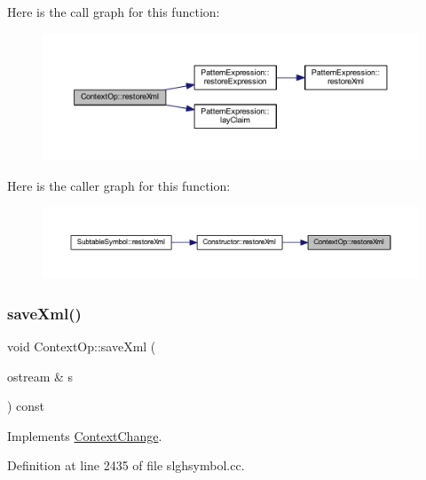 Here is the call graph for this function\+:
\nopagebreak
\begin{figure}[H]
\begin{center}
\leavevmode
\includegraphics[width=350pt]{class_context_op_ad116f3dd9045a92b84ae10eefaf74f04_cgraph}
\end{center}
\end{figure}
Here is the caller graph for this function\+:
\nopagebreak
\begin{figure}[H]
\begin{center}
\leavevmode
\includegraphics[width=350pt]{class_context_op_ad116f3dd9045a92b84ae10eefaf74f04_icgraph}
\end{center}
\end{figure}
\mbox{\label{class_context_op_ab0ddc8b720a9958f4dff5dae7f6cd288}} 
\subsubsection{\texorpdfstring{saveXml()}{saveXml()}}
{\footnotesize\ttfamily void Context\+Op\+::save\+Xml (\begin{DoxyParamCaption}\item[{ostream \&}]{s }\end{DoxyParamCaption}) const\hspace{0.3cm}{\ttfamily [virtual]}}



Implements \mbox{\hyperlink{class_context_change_a9874429eee192c35909a130dfdbbc83d}{Context\+Change}}.



Definition at line 2435 of file slghsymbol.\+cc.

